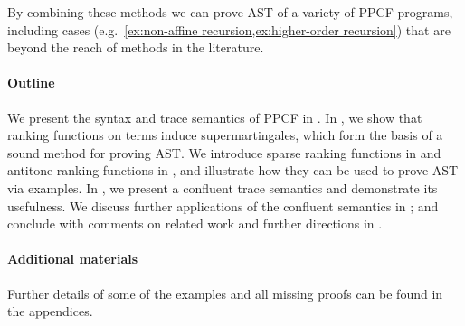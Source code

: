 By combining these methods we can prove AST of a variety of PPCF programs, including cases (e.g.~\cref{ex:non-affine recursion,ex:higher-order recursion}) that are beyond the reach of methods in the literature.

\paragraph*{Outline}

We present the syntax and trace semantics of PPCF in .
In , we show that ranking functions on terms induce supermartingales, which form the basis of a sound method for proving AST.
We introduce sparse ranking functions in  and antitone ranking functions in , and illustrate how they can be used to prove AST via examples. 
In , we present a confluent trace semantics and demonstrate its usefulness.
We discuss further applications of the confluent semantics in ; and conclude with comments on related work and further directions in .

\paragraph*{Additional materials} Further details of some of the examples and all missing proofs can be found in the appendices.
